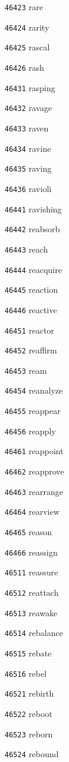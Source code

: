 \documentclass[twoside,11pt]{article}
\begin{document}
\begin{multicols}{5}
\begin{enumerate}
\item[\texttt{46423}] rare
\item[\texttt{46424}] rarity
\item[\texttt{46425}] rascal
\item[\texttt{46426}] rash
\item[\texttt{46431}] rasping
\item[\texttt{46432}] ravage
\item[\texttt{46433}] raven
\item[\texttt{46434}] ravine
\item[\texttt{46435}] raving
\item[\texttt{46436}] ravioli
\item[\texttt{46441}] ravishing
\item[\texttt{46442}] reabsorb
\item[\texttt{46443}] reach
\item[\texttt{46444}] reacquire
\item[\texttt{46445}] reaction
\item[\texttt{46446}] reactive
\item[\texttt{46451}] reactor
\item[\texttt{46452}] reaffirm
\item[\texttt{46453}] ream
\item[\texttt{46454}] reanalyze
\item[\texttt{46455}] reappear
\item[\texttt{46456}] reapply
\item[\texttt{46461}] reappoint
\item[\texttt{46462}] reapprove
\item[\texttt{46463}] rearrange
\item[\texttt{46464}] rearview
\item[\texttt{46465}] reason
\item[\texttt{46466}] reassign
\item[\texttt{46511}] reassure
\item[\texttt{46512}] reattach
\item[\texttt{46513}] reawake
\item[\texttt{46514}] rebalance
\item[\texttt{46515}] rebate
\item[\texttt{46516}] rebel
\item[\texttt{46521}] rebirth
\item[\texttt{46522}] reboot
\item[\texttt{46523}] reborn
\item[\texttt{46524}] rebound

\end{enumerate}
\end{multicols}
\end{document}
